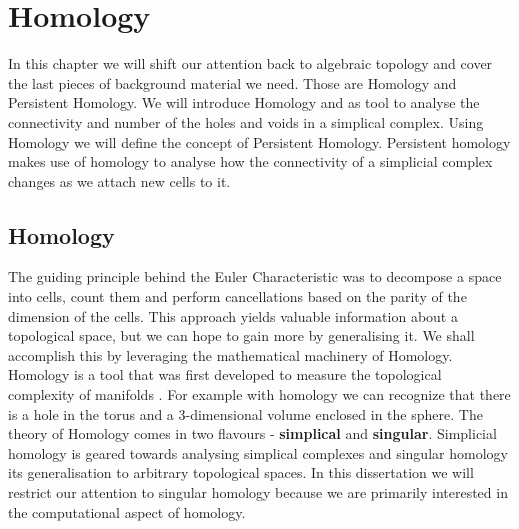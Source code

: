 \chapter{Homology}
\label{chapter5}

In this chapter we will shift our attention back to algebraic topology and cover the last pieces of background material we need. Those are Homology and Persistent Homology. We will introduce Homology and as tool to analyse the connectivity and number of the holes and voids in a simplical complex. Using Homology we will define the concept of Persistent Homology. Persistent homology makes use of homology to analyse how the connectivity of a simplicial complex changes as we attach new cells to it.

\section{Homology}



The guiding principle behind the Euler Characteristic was to decompose a space into cells, count them and perform cancellations based on the parity of the dimension of the cells. This approach yields valuable information about a topological space, but we can hope to gain more by generalising it. We shall accomplish this by leveraging the mathematical machinery of Homology. Homology is a tool that was first developed to measure the topological complexity of manifolds \cite{persistence-original}. For example with homology we can recognize that there is a hole in the torus and a 3-dimensional volume enclosed in the sphere. The theory of Homology comes in two flavours - \textbf{simplical} and \textbf{singular}. Simplicial homology is geared towards analysing simplical complexes and singular homology its generalisation to arbitrary topological spaces. In this dissertation we will restrict our attention to singular homology because we are primarily interested in the computational aspect of homology.

